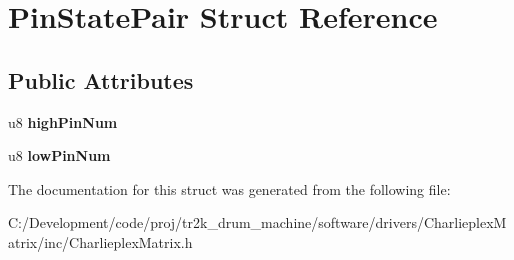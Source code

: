 \hypertarget{struct_pin_state_pair}{}\section{Pin\+State\+Pair Struct Reference}
\label{struct_pin_state_pair}
\subsection*{Public Attributes}
\begin{DoxyCompactItemize}
\item 
\mbox{\label{struct_pin_state_pair_afbe9a9438a29c41f960cc126370cb00a}} 
u8 {\bfseries high\+Pin\+Num}
\item 
\mbox{\label{struct_pin_state_pair_aff70da236383612c8830449f8695d173}} 
u8 {\bfseries low\+Pin\+Num}
\end{DoxyCompactItemize}


The documentation for this struct was generated from the following file\+:\begin{DoxyCompactItemize}
\item 
C\+:/\+Development/code/proj/tr2k\+\_\+drum\+\_\+machine/software/drivers/\+Charlieplex\+Matrix/inc/Charlieplex\+Matrix.\+h\end{DoxyCompactItemize}
